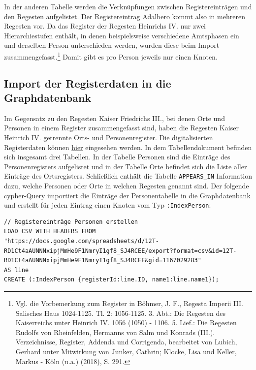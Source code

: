 \documentclass[ngerman,]{scrreprt}
\begin{document}
In der anderen Tabelle werden die Verknüpfungen zwischen Registereinträgen und den Regesten aufgelistet. Der Registereintrag Adalbero kommt also in mehreren Regesten vor. Da das Register der Regesten Heinrichs IV. nur zwei Hierarchiestufen enthält, in denen beispielsweise verschiedene Amtsphasen ein und derselben Person unterschieden werden, wurden diese beim Import zusammengefasst.\footnote{Vgl. die Vorbemerkung zum Register in Böhmer, J. F., Regesta Imperii III. Salisches Haus 1024-1125. Tl. 2: 1056-1125. 3. Abt.: Die Regesten des Kaiserreichs unter Heinrich IV. 1056 (1050) - 1106. 5. Lief.: Die Regesten Rudolfs von Rheinfelden, Hermanns von Salm und Konrads (III.). Verzeichnisse, Register, Addenda und Corrigenda, bearbeitet von Lubich, Gerhard unter Mitwirkung von Junker, Cathrin; Klocke, Lisa und Keller, Markus - Köln (u.a.) (2018), S. 291.} Damit gibt es pro Person jeweils nur einen Knoten.

\subsection{Import der Registerdaten in die Graphdatenbank}\label{import-der-registerdaten-in-die-graphdatenbank-1}

Im Gegensatz zu den Regesten Kaiser Friedrichs III., bei denen Orte und Personen in einem Register zusammengefasst sind, haben die Regesten Kaiser Heinrich IV. getrennte Orts- und Personenregister. Die digitalisierten Registerdaten können \href{https://docs.google.com/spreadsheets/d/12T-RD1Ct4aAUNNNxipjMmHe9F1NmryI1gf8_SJ4RCEE/edit?usp=sharing}{hier} eingesehen werden. In dem Tabellendokument befinden sich insgesamt drei Tabellen. In der Tabelle Personen sind die Einträge des Personenregisters aufgelistet und in der Tabelle Orte befindet sich die Liste aller Einträge des Ortsregisters. Schließlich enthält die Tabelle \texttt{APPEARS\_IN} Information dazu, welche Personen oder Orte in welchen Regesten genannt sind. Der folgende cypher-Query importiert die Einträge der Personentabelle in die Graphdatenbank und erstellt für jeden Eintrag einen Knoten vom Typ \texttt{:IndexPerson}:

\begin{verbatim}
// Registereinträge Personen erstellen
LOAD CSV WITH HEADERS FROM "https://docs.google.com/spreadsheets/d/12T-RD1Ct4aAUNNNxipjMmHe9F1NmryI1gf8_SJ4RCEE/export?format=csv&id=12T-RD1Ct4aAUNNNxipjMmHe9F1NmryI1gf8_SJ4RCEE&gid=1167029283"
AS line
CREATE (:IndexPerson {registerId:line.ID, name1:line.name1});
\end{verbatim}
\end{document}
